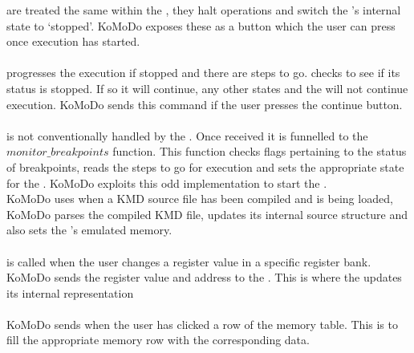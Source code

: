 %
 are treated the same within the , they halt operations and switch the 's internal state to `stopped'. KoMoDo exposes these as a button which the user can press once execution has started.\\\\
%
 progresses the execution if stopped and there are steps to go.  checks to see if its status is stopped. If so it will continue, any other states and the  will not continue execution. KoMoDo sends this command if the user presses the continue button.\\\\
%
 is not conventionally handled by the . Once received it is funnelled to the $monitor\_breakpoints$ function. This function checks flags pertaining to the status of breakpoints, reads the steps to go for execution and sets the appropriate state for the . KoMoDo exploits this odd implementation to start the .\\
%
%
%
%
KoMoDo uses  when a KMD source file has been compiled and is being loaded, KoMoDo parses the compiled KMD file, updates its internal source structure and also sets the 's emulated memory.\\\\
%
 is called when the user changes a register value in a specific register bank. KoMoDo sends the register value and address to the . This is where the  updates its internal representation\\\\
%
KoMoDo sends  when the user has clicked a row of the memory table. This is to fill the appropriate memory row with the corresponding data.\\\\
